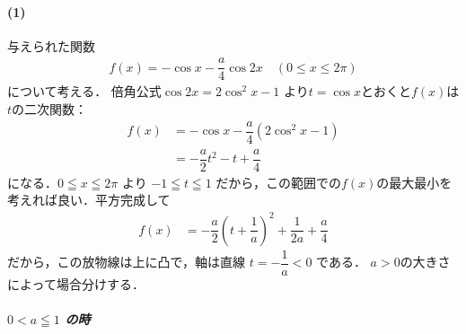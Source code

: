 \documentclass[../../main.tex]{subfiles}
\begin{document}
\paragraph{(1)}
与えられた関数
\begin{align}
  f(x) = -\cos x - \dfrac{a}{4}\cos 2x \quad (0\le x \le 2\pi) \label{eq:8}
\end{align}
について考える．
倍角公式$\cos 2x = 2\cos^2 x - 1$ より$t=\cos x$とおくと$f(x)$は$t$の二次関数：
\begin{align}
  f(x)
  & =  -\cos x - \dfrac{a}{4}\left(2\cos^2 x - 1\right) \\
  & =  -\dfrac{a}{2}t^2 - t + \dfrac{a}{4} \label{eq:9}
\end{align}
になる．$0 \leqq x \leqq 2\pi$ より $-1 \leqq t \leqq 1$ だから，この範囲での$f(x)$の最大最小を考えれば良い．平方完成して
\begin{align}
  f(x)
  &= -\dfrac{a}{2}\left( t + \dfrac{1}{a} \right)^2 + \dfrac{1}{2a} + \dfrac{a}{4}
\end{align}
だから，この放物線は上に凸で，軸は直線 $t = -\dfrac{1}{a} < 0$ である．
$a>0$の大きさによって場合分けする．

\subparagraph{$0 < a \leqq 1$ の時}
\end{document}
